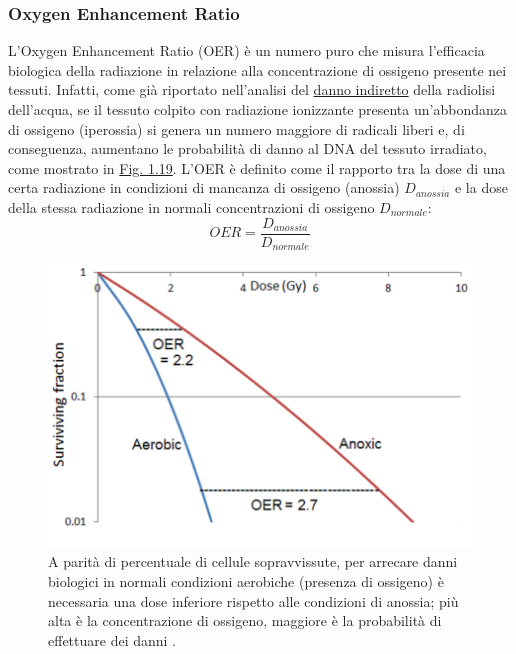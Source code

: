 \documentclass[12pt,a4paper,twoside]{report}
\begin{document}
	\subsubsection{Oxygen Enhancement Ratio}\label{par:oer}
	L'Oxygen Enhancement Ratio (OER) è un numero puro che misura l'efficacia biologica della radiazione in relazione alla concentrazione di ossigeno presente nei tessuti. Infatti, come già riportato nell'analisi del \hyperref[par:danno_indiretto]{danno indiretto} della radiolisi dell'acqua, se il tessuto colpito con radiazione ionizzante presenta un'abbondanza di ossigeno (iperossia) si genera un numero maggiore di radicali liberi e, di conseguenza, aumentano le probabilità di danno al DNA del tessuto irradiato, come mostrato in \hyperref[fig:oer_survival]{Fig. 1.19}. L'OER è definito come il rapporto tra la dose di una certa radiazione in condizioni di mancanza di ossigeno (anossia) $D_{anossia}$ e la dose della stessa radiazione in normali concentrazioni di ossigeno $D_{normale}$:
	\begin{equation}
		OER=\frac{D_{anossia}}{D_{normale}}
		\label{eq:oer}
	\end{equation}
	\begin{figure}[H]
		\centering
		\includegraphics[width=0.73\linewidth]{oer_survival.png}
		\caption{A parità di percentuale di cellule sopravvissute, per arrecare danni biologici in normali condizioni aerobiche (presenza di ossigeno) è necessaria una dose inferiore rispetto alle condizioni di anossia; più alta è la concentrazione di ossigeno, maggiore è la probabilità di effettuare dei danni \cite{ox_effect_wiki}.}
		\label{fig:oer_survival}
	\end{figure}
\end{document}
